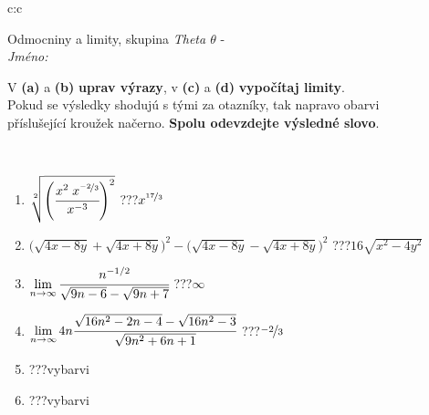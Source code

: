 \documentclass[10pt]{report}
\begin{document}
\newpage
\thispagestyle{empty}
\begin{tabular}{c:c}
\begin{minipage}[c][104.5mm][t]{0.5\linewidth}
\begin{center}
\vspace{7mm}
{\huge Odmocniny a limity, skupina \textit{Theta $\theta$} -}\\[5mm]
\textit{Jméno:}\phantom{xxxxxxxxxxxxxxxxxxxxxxxxxxxxxxxxxxxxxxxxxxxxxxxxxxxxxxxxxxxxxxxxx}\\[5mm]
\begin{minipage}{0.95\linewidth}
\begin{center}
V \textbf{(a)} a \textbf{(b)} \textbf{uprav výrazy}, v \textbf{(c)} a \textbf{(d)} \textbf{vypočítaj limity}.\\Pokud se výsledky shodujú s tými za otazníky, tak napravo obarvi\\příslušející kroužek načerno. \textbf{Spolu odevzdejte výsledné slovo}.
\end{center}
\end{minipage}
\\[1mm]
\begin{minipage}{0.79\linewidth}
\begin{center}
\begin{varwidth}{\linewidth}
\begin{enumerate}
\small
\item $\sqrt[2]{\left(\cfrac{x^{2}\;x^{\nicefrac{-2}{3}}}{x^{-3}}\right)^{2}}$\quad \dotfill\; ???\;\dotfill \quad $x^{\nicefrac{17}{3}}$
\item {\footnotesize{\scriptsize$\big(\sqrt{4x-8y}+\sqrt{4x+8y}\big)^2-\big(\sqrt{4x-8y}-\sqrt{4x+8y}\big)^2$}\quad \dotfill\; ???\;\dotfill \quad $16\sqrt{x^2-4y^2}$}
\item $\lim\limits_{n\to\infty}\cfrac{n^{-1/2}}{\sqrt{9n-6}-\sqrt{9n+7}}$\quad \dotfill\; ???\;\dotfill \quad $\infty$
\item $\lim\limits_{n\to\infty}4n\cfrac{\sqrt{16n^2-2n-4}-\sqrt{16n^2-3}}{\sqrt{9n^2+6n+1}}$\quad \dotfill\; ???\;\dotfill \quad $\nicefrac{-2}{3}$
\item \quad \dotfill\; ???\;\dotfill \quad vybarvi
\item \quad \dotfill\; ???\;\dotfill \quad vybarvi
\end{enumerate}
\end{varwidth}
\end{center}
\end{minipage}
\begin{minipage}{0.20\linewidth}

\end{minipage}
\end{center}
\end{minipage}
\end{tabular}
\end{document}
